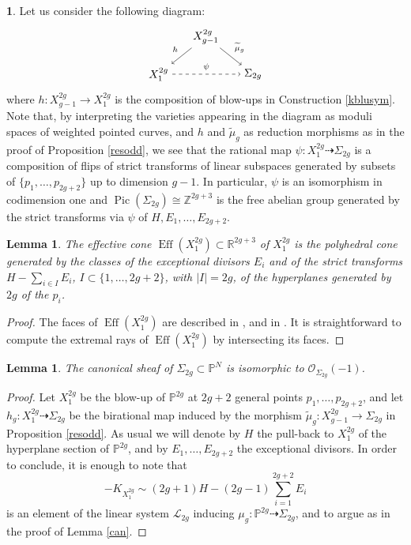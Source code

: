 \documentclass[a4paper,10pt]{amsart}
\newtheorem{Lemma}[thm]{Lemma}
\theoremstyle{definition}
\newtheorem{say}[thm]{}
\DeclareMathOperator{\Pic}{Pic}
\DeclareMathOperator{\Eff}{Eff}
\begin{document}
\begin{say}\label{small}
Let us consider the following diagram:
\[
  \begin{tikzpicture}[xscale=1.5,yscale=-1.2]
    \node (A0_1) at (1, 0) {$X^{2g}_{g-1}$};
    \node (A1_0) at (0, 1) {$X^{2g}_1$};
    \node (A1_2) at (2, 1) {$\Sigma_{2g}$};
    \path (A0_1) edge [->] node [auto] {$\scriptstyle{\widetilde{\mu}_g}$} (A1_2);
    \path (A0_1) edge [->,swap] node [auto] {$\scriptstyle{h}$} (A1_0);
    \path (A1_0) edge [->,dashed] node [auto] {$\scriptstyle{\psi}$} (A1_2);
  \end{tikzpicture}
  \]
where $h:X^{2g}_{g-1}\rightarrow X^{2g}_1$ is the composition of blow-ups in Construction \ref{kblusym}. Note that, by interpreting the varieties appearing in the diagram as moduli spaces of weighted pointed curves, and $h$ and $\widetilde{\mu}_g$ as reduction morphisms as in the proof of Proposition \ref{resodd}, we see that the rational map $\psi:X^{2g}_1\dasharrow \Sigma_{2g}$ is a composition of flips of strict transforms of linear subspaces generated by subsets of $\{p_1,\dots,p_{2g+2}\}$ up to dimension $g-1$. In particular, $\psi$ is an isomorphism in codimension one and $\Pic(\Sigma_{2g})\cong \mathbb{Z}^{2g+3}$ is the free abelian group generated by the strict transforms via $\psi$ of $H,E_1,\dots,E_{2g+2}$. 
\end{say}

\begin{Lemma}\label{eff}
The effective cone $\Eff(X^{2g}_1)\subset \mathbb{R}^{2g+3}$ of $X^{2g}_1$ is the polyhedral cone generated by the classes of the exceptional divisors $E_i$ and of the strict transforms $H-\sum_{i\in I}E_i$, $I\subset\{1,\dots,2g+2\}$, with $|I| = 2g$, of the hyperplanes generated by $2g$ of the $p_i$.
\end{Lemma}
\begin{proof}
The faces of $\Eff(X^{2g}_1)$ are described in \cite[Lemma 4.24]{CT06}, and in \cite[Corollary 2.5]{BDP16}. It is straightforward to compute the extremal rays of $\Eff(X^{2g}_1)$ by intersecting its faces.
\end{proof}

\begin{Lemma}\label{canodd}
The canonical sheaf of $\Sigma_{2g}\subset\mathbb{P}^N$ is isomorphic to $\mathcal{O}_{\Sigma_{2g}}(-1)$.
\end{Lemma}
\begin{proof}
Let $X^{2g}_1$ be the blow-up of $\mathbb{P}^{2g}$ at $2g+2$ general points $p_1,\dots,p_{2g+2}$, and let $h_g:X^{2g}_1\dasharrow \Sigma_{2g}$ be the birational map induced by the morphism $\widetilde{\mu}_g:X^{2g}_{g-1}\rightarrow \Sigma_{2g}$ in Proposition \ref{resodd}. As usual we will denote by $H$ the pull-back to $X_1^{2g}$ of the hyperplane section of $\mathbb{P}^{2g}$, and by $E_{1},\dots,E_{2g+2}$ the exceptional divisors. In order to conclude, it is enough to note that
$$-K_{X^{2g}_1}\sim (2g+1)H-(2g-1)\sum_{i=1}^{2g+2}E_i$$ 
is an element of the linear system $\mathcal{L}_{2g}$ inducing $\mu_g:\mathbb{P}^{2g}\dasharrow \Sigma_{2g}$, and to argue as in the proof of Lemma \ref{can}.
\end{proof}
\end{document}
